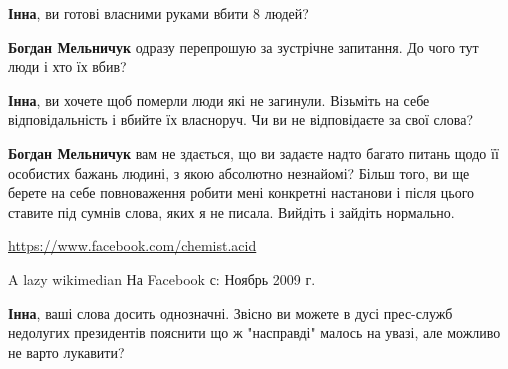 \begin{itemize}
\begin{itemize}
 
\textbf{Інна}, ви готові власними руками вбити 8 людей?

\begin{itemize}

 
\textbf{Богдан Мельничук} одразу перепрошую за зустрічне запитання.
До чого тут люди і хто їх вбив?

 
\textbf{Інна}, ви хочете щоб померли люди які не загинули. Візьміть на себе
відповідальність і вбийте їх власноруч. Чи ви не відповідаєте за свої слова?


\textbf{Богдан Мельничук} вам не здається, що ви задаєте надто багато питань
щодо її особистих бажань людині, з якою абсолютно незнайомі? Більш того, ви ще
берете на себе повноваження робити мені конкретні настанови і після цього
ставите під сумнів слова, яких я не писала.  Вийдіть і зайдіть нормально.

\url{https://www.facebook.com/chemist.acid}\par
A lazy wikimedian
На Facebook с: Ноябрь 2009 г.
 
\textbf{Інна}, ваші слова досить однозначні. Звісно ви можете в дусі прес-служб
недолугих президентів пояснити що ж "насправді" малось на увазі, але можливо не
варто лукавити?

 


\end{itemize}
\end{itemize}
\end{itemize}
